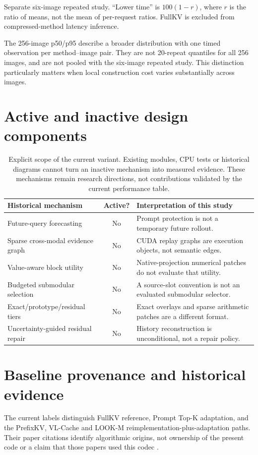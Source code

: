 \documentclass{article}
\begin{document}
\begin{table}[t]
\centering\small
\caption{Separate six-image repeated study. ``Lower time'' is $100(1-r)$,
where $r$ is the ratio of means, not the mean of per-request ratios. FullKV
is excluded from compressed-method latency inference.}
\label{tab:repeated}
\end{table}
The 256-image p50/p95 describe a broader distribution with one timed
observation per method--image pair. They are not 20-repeat quantiles for
all 256 images, and are not pooled with the six-image repeated study.
This distinction particularly matters when local construction cost varies
substantially across images.

\section{Active and inactive design components}
\begin{table}[t]
\centering\small
\begin{tabularx}{\textwidth}{l c Y}
\toprule
Historical mechanism & Active? & Interpretation of this study\\
\midrule
Future-query forecasting & No & Prompt protection is not a temporary future rollout.\\
Sparse cross-modal evidence graph & No & CUDA replay graphs are execution objects, not semantic edges.\\
Value-aware block utility & No & Native-projection numerical patches do not evaluate that utility.\\
Budgeted submodular selection & No & A source-slot convention is not an evaluated submodular selector.\\
Exact/prototype/residual tiers & No & Exact overlays and sparse arithmetic patches are a different format.\\
Uncertainty-guided residual repair & No & History reconstruction is unconditional, not a repair policy.\\
\bottomrule
\end{tabularx}
\caption{Explicit scope of the current variant. Existing modules, CPU tests
or historical diagrams cannot turn an inactive mechanism into measured
evidence. These mechanisms remain research directions, not contributions
validated by the current performance table.}
\end{table}

\section{Baseline provenance and historical evidence}
The current labels distinguish FullKV reference, Prompt Top-K adaptation,
and the PrefixKV, VL-Cache and LOOK-M reimplementation-plus-adaptation
paths. Their paper citations identify algorithmic origins, not ownership
of the present code or a claim that those papers used this codec
\citep{wang2025prefixkv,tu2025vlcache,wan2024lookm}.
\end{document}
